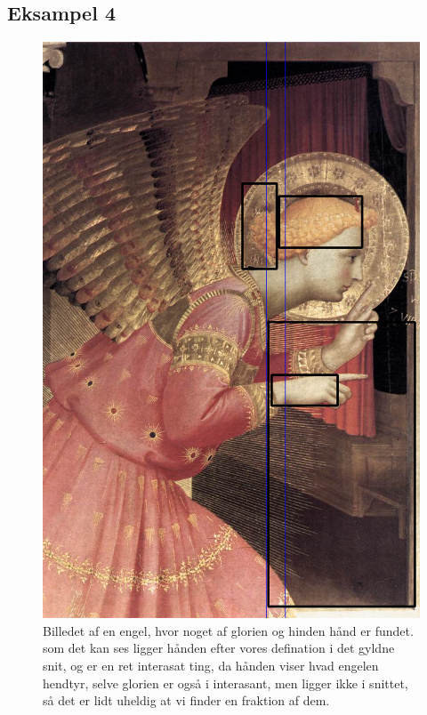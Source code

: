 \subsection{Eksampel 4}
\begin{figure}[h!!]
	\begin{center}
		\includegraphics[scale=0.30,angle=0]{afsnit/afprovning/billeder/BB1annunc2.png}
	\end{center}
	\caption[]{Billedet af en engel, hvor noget af glorien og hinden
	           hånd er fundet. som det kan ses ligger hånden efter vores
	           defination i det gyldne snit, og er en ret interasat
	           ting, da hånden viser hvad engelen hendtyr, selve glorien
	           er også i interasant, men ligger ikke i snittet, så det
	           er lidt uheldig at vi finder en fraktion af dem.}
	\label{BB1annunc2}
\end{figure}

